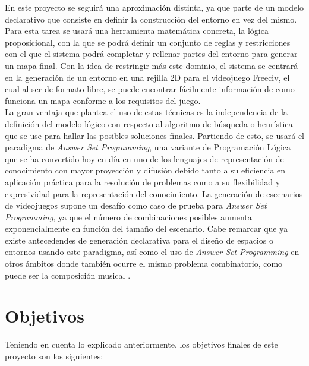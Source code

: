 En este proyecto se seguirá una aproximación distinta, ya que parte de un modelo declarativo que consiste en definir la construcción del entorno en vez del mismo. Para esta tarea se usará una herramienta matemática concreta, la lógica proposicional, con la que se podrá definir un conjunto de reglas y restricciones con el que el sistema podrá completar y rellenar partes del entorno para generar un mapa final. Con la idea de restringir más este dominio, el sistema se centrará en la generación de un entorno en una rejilla 2D para el videojuego Freeciv, el cual al ser de formato libre, se puede encontrar fácilmente información de como funciona un mapa conforme a los requisitos del juego. \\

La gran ventaja que plantea el uso de estas técnicas es la independencia de la definición del modelo lógico con respecto al algoritmo de búsqueda o heurística que se use para hallar las posibles soluciones finales. Partiendo de esto, se usará el paradigma de \textit{Answer Set Programming}, una variante de Programación Lógica que se ha convertido hoy en día en uno de los lenguajes de representación de conocimiento con mayor proyección y difusión debido tanto a su eficiencia en aplicación práctica para la resolución de problemas como a su flexibilidad y expresividad para la representación del conocimiento. La generación de escenarios de videojuegos supone un desafío como caso de prueba para \textit{Answer Set Programming}, ya que el número de combinaciones posibles aumenta exponencialmente en función del tamaño del escenario. Cabe remarcar que ya existe antecedendes de generación declarativa para el diseño de espacios o entornos \cite{desing} usando este paradigma, así como el uso de \textit{Answer Set Programming} en otros ámbitos donde también ocurre el mismo problema combinatorio, como puede ser la composición musical \cite{haspie} \cite{DBLP:journals/corr/abs-1006-4948}.

\section{Objetivos}

Teniendo en cuenta lo explicado anteriormente, los objetivos finales de este proyecto son los siguientes:

